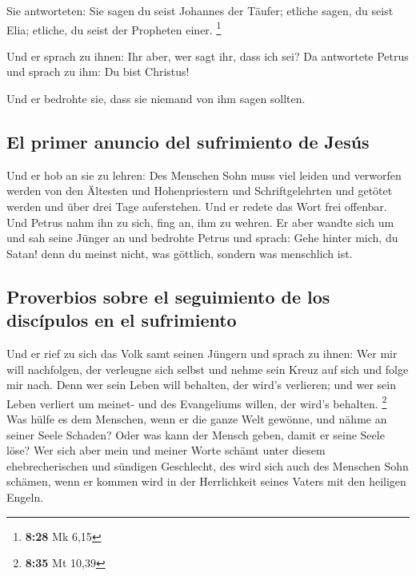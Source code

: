  Sie antworteten: Sie sagen du seist Johannes der Täufer;
etliche sagen, du seist Elia; etliche, du seist der Propheten einer.
\footnote{\textbf{8:28} Mk 6,15}

 Und er sprach zu ihnen: Ihr aber, wer sagt ihr, dass ich
sei? Da antwortete Petrus und sprach zu ihm: Du bist Christus!

 Und er bedrohte sie, dass sie niemand von ihm sagen
sollten.

\hypertarget{el-primer-anuncio-del-sufrimiento-de-jesuxfas}{%
\subsection{El primer anuncio del sufrimiento de
Jesús}\label{el-primer-anuncio-del-sufrimiento-de-jesuxfas}}

 Und er hob an sie zu lehren: Des Menschen Sohn muss viel
leiden und verworfen werden von den Ältesten und Hohenpriestern und
Schriftgelehrten und getötet werden und über drei Tage auferstehen.
 Und er redete das Wort frei offenbar. Und Petrus nahm
ihn zu sich, fing an, ihm zu wehren.  Er aber wandte sich
um und sah seine Jünger an und bedrohte Petrus und sprach: Gehe hinter
mich, du Satan! denn du meinst nicht, was göttlich, sondern was
menschlich ist.

\hypertarget{proverbios-sobre-el-seguimiento-de-los-discuxedpulos-en-el-sufrimiento}{%
\subsection{Proverbios sobre el seguimiento de los discípulos en el
sufrimiento}\label{proverbios-sobre-el-seguimiento-de-los-discuxedpulos-en-el-sufrimiento}}

 Und er rief zu sich das Volk samt seinen Jüngern und
sprach zu ihnen: Wer mir will nachfolgen, der verleugne sich selbst und
nehme sein Kreuz auf sich und folge mir nach.  Denn wer
sein Leben will behalten, der wird's verlieren; und wer sein Leben
verliert um meinet- und des Evangeliums willen, der wird's behalten.
\footnote{\textbf{8:35} Mt 10,39}  Was hülfe es dem
Menschen, wenn er die ganze Welt gewönne, und nähme an seiner Seele
Schaden?  Oder was kann der Mensch geben, damit er seine
Seele löse?  Wer sich aber mein und meiner Worte schämt
unter diesem ehebrecherischen und sündigen Geschlecht, des wird sich
auch des Menschen Sohn schämen, wenn er kommen wird in der Herrlichkeit
seines Vaters mit den heiligen Engeln.

